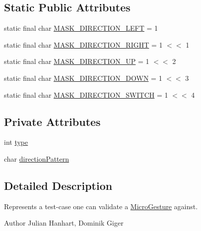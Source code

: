 \subsection*{Static Public Attributes}
\begin{DoxyCompactItemize}
\item 
static final char \hyperlink{classch_1_1zhaw_1_1ba10__bsha__1_1_1service_1_1MicroGestureTester_a05ec6c9016ce624ac7befd9a615ac316}{MASK\_\-DIRECTION\_\-LEFT} = 1
\item 
static final char \hyperlink{classch_1_1zhaw_1_1ba10__bsha__1_1_1service_1_1MicroGestureTester_a6e7e9529756ed13eb1c5c8866a495a75}{MASK\_\-DIRECTION\_\-RIGHT} = 1 $<$$<$ 1
\item 
static final char \hyperlink{classch_1_1zhaw_1_1ba10__bsha__1_1_1service_1_1MicroGestureTester_a25a88ac488549097f1dc30228094d8c6}{MASK\_\-DIRECTION\_\-UP} = 1 $<$$<$ 2
\item 
static final char \hyperlink{classch_1_1zhaw_1_1ba10__bsha__1_1_1service_1_1MicroGestureTester_ab7e85bde474db08a040451c33b4b6885}{MASK\_\-DIRECTION\_\-DOWN} = 1 $<$$<$ 3
\item 
static final char \hyperlink{classch_1_1zhaw_1_1ba10__bsha__1_1_1service_1_1MicroGestureTester_aeca290bcd16eecee3b90f5b02f1cdd8f}{MASK\_\-DIRECTION\_\-SWITCH} = 1 $<$$<$ 4
\end{DoxyCompactItemize}
\subsection*{Private Attributes}
\begin{DoxyCompactItemize}
\item 
int \hyperlink{classch_1_1zhaw_1_1ba10__bsha__1_1_1service_1_1MicroGestureTester_a1bf3c9be31f7a6293aa8e6d30e51fd56}{type}
\item 
char \hyperlink{classch_1_1zhaw_1_1ba10__bsha__1_1_1service_1_1MicroGestureTester_a9c587f2d873a013f9ff1c1e053181fbb}{directionPattern}
\end{DoxyCompactItemize}


\subsection{Detailed Description}
Represents a test-\/case one can validate a \hyperlink{classch_1_1zhaw_1_1ba10__bsha__1_1_1service_1_1MicroGesture}{MicroGesture} against.

\begin{DoxyAuthor}{Author}
Julian Hanhart, Dominik Giger 
\end{DoxyAuthor}


